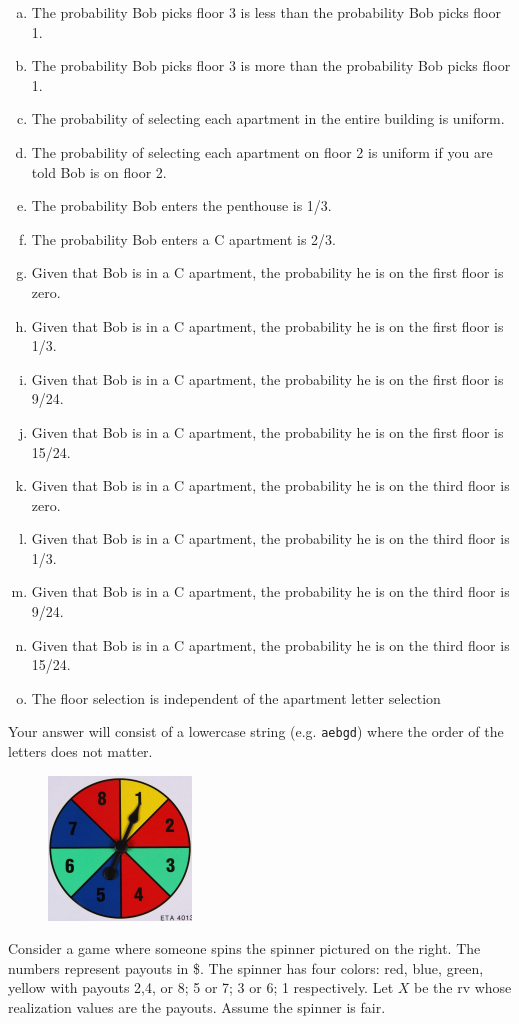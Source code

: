 \documentclass[12pt,landscape]{article}
\newcommand{\instr}{\small Your answer will consist of a lowercase string (e.g. \texttt{aebgd}) where the order of the letters does not matter. \normalsize}
\begin{document}
\vspace{-0.2cm}\benum{} 
\begin{enumerate}[(a)]
\item The probability Bob picks floor 3 is less than the probability Bob picks floor 1.
\item The probability Bob picks floor 3 is more than the probability Bob picks floor 1.
\item The probability of selecting each apartment in the entire building is uniform.
\item The probability of selecting each apartment on floor 2 is uniform if you are told Bob is on floor 2.
\item The probability Bob enters the penthouse is 1/3.
\item The probability Bob enters a C apartment is 2/3.
\item Given that Bob is in a C apartment, the probability he is on the first floor is zero.
\item Given that Bob is in a C apartment, the probability he is on the first floor is 1/3.
\item Given that Bob is in a C apartment, the probability he is on the first floor is 9/24.
\item Given that Bob is in a C apartment, the probability he is on the first floor is 15/24.
\item Given that Bob is in a C apartment, the probability he is on the third floor is zero.
\item Given that Bob is in a C apartment, the probability he is on the third floor is 1/3.
\item Given that Bob is in a C apartment, the probability he is on the third floor is 9/24.
\item Given that Bob is in a C apartment, the probability he is on the third floor is 15/24.
\item The floor selection is independent of the apartment letter selection
\end{enumerate}
\eenum\instr\pagebreak

\vspace{-0.4cm}
\begin{figure}
\includegraphics[width=1.5in]{spinner.png}
\end{figure} \problem{}  Consider a game where someone spins the spinner pictured on the right. The numbers represent payouts in \$. The spinner has four colors: red, blue, green, yellow with payouts 2,4, or 8; 5 or 7; 3 or 6; 1 respectively. Let $X$ be the rv whose realization values are the payouts. Assume the spinner is fair.
\end{document}
